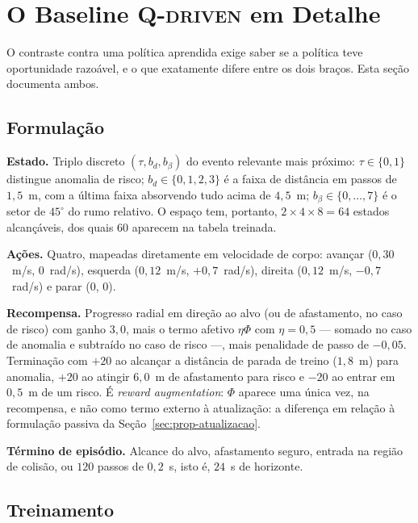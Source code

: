 \section{O Baseline \textsc{Q-driven} em Detalhe}
\label{sec:setup-qdriven}

O contraste contra uma política aprendida exige saber se a política teve oportunidade
razoável, e o que exatamente difere entre os dois braços. Esta seção documenta ambos.

\subsection{Formulação}

\textbf{Estado.} Triplo discreto $(\tau, b_d, b_\beta)$ do evento relevante mais
próximo: $\tau\in\{0,1\}$ distingue anomalia de risco; $b_d\in\{0,1,2,3\}$ é a faixa de
distância em passos de $1{,}5$~m, com a última faixa absorvendo tudo acima de
$4{,}5$~m; $b_\beta\in\{0,\dots,7\}$ é o setor de $45^\circ$ do rumo relativo. O espaço
tem, portanto, $2\times4\times8=64$ estados alcançáveis, dos quais $60$ aparecem na
tabela treinada.

\textbf{Ações.} Quatro, mapeadas diretamente em velocidade de corpo: avançar
($0{,}30$~m/s, $0$~rad/s), esquerda ($0{,}12$~m/s, $+0{,}7$~rad/s), direita
($0{,}12$~m/s, $-0{,}7$~rad/s) e parar ($0$, $0$).

\textbf{Recompensa.} Progresso radial em direção ao alvo (ou de afastamento, no caso de
risco) com ganho $3{,}0$, mais o termo afetivo $\eta\Phi$ com $\eta=0{,}5$ --- somado no
caso de anomalia e subtraído no caso de risco ---, mais penalidade de passo de
$-0{,}05$. Terminação com $+20$ ao alcançar a distância de parada de treino
($1{,}8$~m) para anomalia, $+20$ ao atingir $6{,}0$~m de afastamento para risco e
$-20$ ao entrar em $0{,}5$~m de um risco. É \emph{reward augmentation}: $\Phi$ aparece
uma única vez, na recompensa, e não como termo externo à atualização: a diferença
em relação à formulação passiva da Seção~\ref{sec:prop-atualizacao}.

\textbf{Término de episódio.} Alcance do alvo, afastamento seguro, entrada na região de
colisão, ou $120$ passos de $0{,}2$~s, isto é, $24$~s de horizonte.

\subsection{Treinamento}

